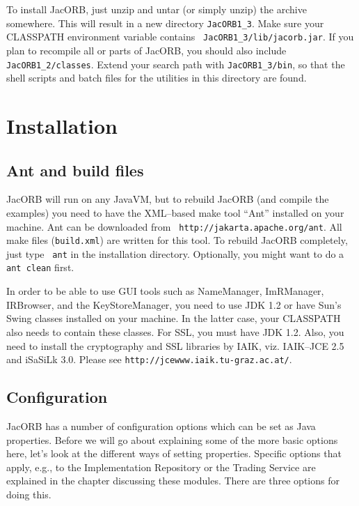 \documentclass[12pt]{scrbook}
\begin{document}
To install JacORB, just unzip  and untar (or simply unzip) the archive
somewhere.   This will  result in  a new  directory  {\tt JacORB1\_3}.
Make   sure  your   CLASSPATH  environment   variable   contains  {\tt
JacORB1\_3/lib/jacorb.jar}.  If you plan  to recompile all or parts of
JacORB, you should also include {\tt JacORB1\_2/classes}.  Extend your
search path with  {\tt JacORB1\_3/bin}, so that the  shell scripts and
batch files for the utilities in this directory are found.

\section{Installation}
\label{Sec_installation}

\subsection{Ant and build files}

JacORB will run on any JavaVM,  but to rebuild JacORB (and compile the
 examples) you need to have the XML--based make tool ``Ant'' installed
 on    your   machine.    Ant    can   be    downloaded   from    {\tt
 http://jakarta.apache.org/ant}. All make  files ({\tt build.xml}) are
 written for this  tool. To rebuild JacORB completely,  just type {\tt
 ant} in the installation directory.  Optionally, you might want to do
 a {\tt ant clean} first.

In order to be able to  use GUI tools such as NameManager, ImRManager,
IRBrowser, and  the KeyStoreManager, you need  to use JDK  1.2 or have
Sun's Swing  classes installed on  your machine.  In the  latter case,
your CLASSPATH also needs to  contain these classes. For SSL, you must
have  JDK 1.2.  Also, you  need to  install the  cryptography  and SSL
libraries by  IAIK, viz.  IAIK--JCE  2.5 and iSaSiLk 3.0.   Please see
{\tt http://jcewww.iaik.tu-graz.ac.at/}.

\subsection{Configuration}

JacORB has a number of configuration  options which can be set as Java
properties.  Before we will go about explaining some of the more basic
options   here,  let's  look   at  the   different  ways   of  setting
properties. Specific  options that apply, e.g.,  to the Implementation
Repository  or  the  Trading  Service  are explained  in  the  chapter
discussing these modules. There are three options for doing this.
\end{document}
